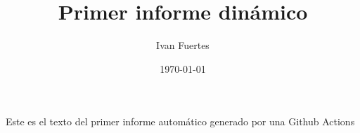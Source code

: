 \documentclass[12pt, a4paper]{book}
\title{Primer informe dinámico}
\author{Ivan Fuertes}
\date{\today}
\begin{document}
\maketitle

Este es el texto del primer informe automático generado por una Github Actions
\end{document}
